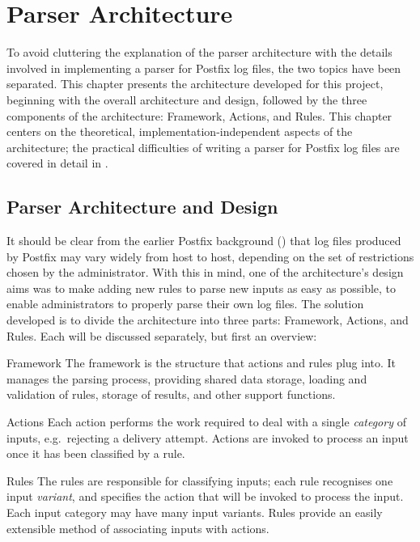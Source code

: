 \chapter{Parser Architecture}

\label{parser architecture}

To avoid cluttering the explanation of the parser architecture with the
details involved in implementing a parser for Postfix log files, the two
topics have been separated.  This chapter presents the architecture
developed for this project, beginning with the overall architecture and
design, followed by the three components of the architecture: Framework,
Actions, and Rules.  This chapter centers on the theoretical,
implementation-independent aspects of the architecture; the practical
difficulties of writing a parser for Postfix log files are covered in
detail in .

\section{Parser Architecture and Design}

\label{parser design}

It should be clear from the earlier Postfix background () that log files produced by Postfix may vary widely from host
to host, depending on the set of restrictions chosen by the administrator.
With this in mind, one of the architecture's design aims was to make adding
new rules to parse new inputs as easy as possible, to enable administrators
to properly parse their own log files.  The solution developed is to divide
the architecture into three parts: Framework, Actions, and Rules.  Each
will be discussed separately, but first an overview:

\begin{eqlist}

    \item [Framework]  The framework is the structure that actions and
        rules plug into.  It manages the parsing process, providing shared
        data storage, loading and validation of rules, storage of results,
        and other support functions.

    \item [Actions] Each action performs the work required to deal with a
        single \textit{category\/} of inputs, e.g.\ rejecting a delivery
        attempt.  Actions are invoked to process an input once it has been
        classified by a rule.

    \item [Rules]  The rules are responsible for classifying inputs; each
        rule recognises one input \textit{variant}, and specifies the
        action that will be invoked to process the input.  Each input
        category may have many input variants.  Rules provide an easily
        extensible method of associating inputs with actions.

\end{eqlist}

